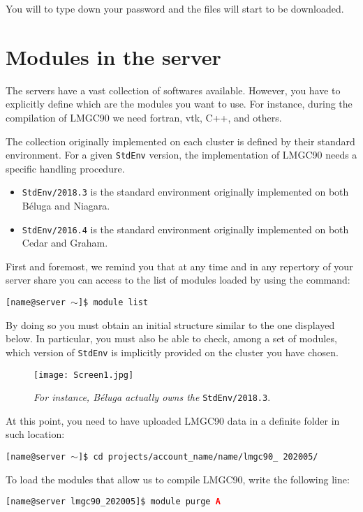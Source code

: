\documentclass[12pt]{article}
\begin{document}
You will to type down your password and the files will start to be downloaded.


\section*{Modules in the server}
The servers have a vast collection of softwares available. However, you have to explicitly define which are the modules you want to use. For instance, during the compilation of LMGC90 we need fortran, vtk, C++, and others.

The collection originally implemented on each cluster is defined by their standard environment. For a given \texttt{StdEnv} version, the implementation of LMGC90 needs a specific handling procedure.
\begin{itemize}
    \item \texttt{StdEnv/2018.3} is the standard environment originally implemented on both Béluga and Niagara.
    \item \texttt{StdEnv/2016.4} is the standard environment originally implemented on both Cedar and Graham.
\end{itemize}

First and foremost, we remind you that at any time and in any repertory of your server share you can access to the list of modules loaded by using the command:
\begin{tcolorbox}
\texttt{[name@server $\sim$]\$ module list}
\end{tcolorbox}

By doing so you must obtain an initial structure similar to the one displayed below. In particular, you must also be able to check, among a set of modules, which version of \texttt{StdEnv} is implicitly provided on the cluster you have chosen.
\begin{figure}[H]
  \centering
  \texttt{[image: Screen1.jpg]}
  \caption*{\textit{For instance, Béluga actually owns the} \texttt{StdEnv/2018.3}.}
\end{figure}
\vspace{-0.4cm}
At this point, you need to have uploaded LMGC90 data in a definite folder in such location:
\begin{tcolorbox}
\texttt{[name@server $\sim$]\$ cd projects/account\_name/name/lmgc90\_ 202005/}
\end{tcolorbox}

\vspace{0.5cm}
To load the modules that allow us to compile LMGC90, write the following line:
\begin{tcolorbox}
\texttt{[name@server lmgc90\_202005]\$ module purge \textcolor{red}{\textbf{A}}} 
\end{tcolorbox}
\vspace{0.5cm}
\end{document}
